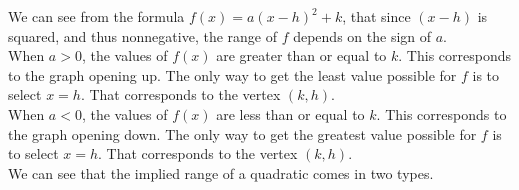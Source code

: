 \documentclass{ximera}
\begin{document}
\begin{image}
\end{image}











We can see from the formula $f(x) = a (x - h)^2 + k$, that since $(x - h)$ is squared, and thus nonnegative, the range of $f$ depends on the sign of $a$. \\

When $a>0$, the values of $f(x)$ are greater than or equal to $k$. This corresponds to the graph opening up.  The only way to get the least value possible for $f$ is to select $x = h$. That corresponds to the vertex $(k, h)$. \\



When $a<0$, the values of $f(x)$ are less than or equal to $k$. This corresponds to the graph opening down.  The only way to get the greatest value possible for $f$ is to select $x = h$. That corresponds to the vertex $(k, h)$.  \\

We can see that the implied range of a quadratic comes in two types.  
\end{document}
